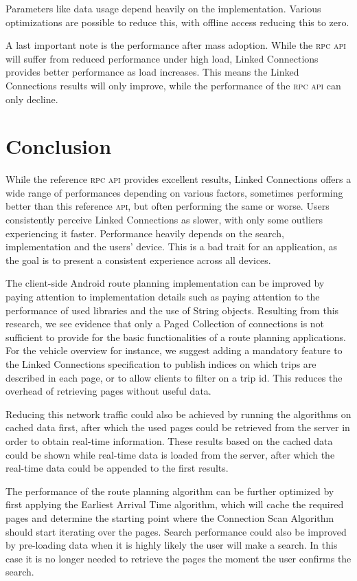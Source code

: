 \documentclass[twocolumn]{phdsymp} %
\begin{document}
Parameters like data usage depend heavily on the implementation. Various optimizations are possible to reduce this, with offline access reducing this to zero.

A last important note is the performance after mass adoption. While the \textsc{rpc} \textsc{api} will suffer from reduced performance under high load, Linked Connections provides better performance as load increases. This means the Linked Connections results will only improve, while the performance of the \textsc{rpc} \textsc{api} can only decline.

\section{Conclusion}
While the reference \textsc{rpc} \textsc{api} provides excellent results, Linked Connections offers a wide range of performances depending on various factors, sometimes performing better than this reference \textsc{api}, but often performing the same or worse. Users consistently perceive Linked Connections as slower, with only some outliers experiencing it faster. Performance heavily depends on the search, implementation and the users’ device. This is a bad trait for an application, as the goal is to present a consistent experience across all devices.

The client-side Android route planning implementation can be improved by paying attention to implementation details such as paying attention to the performance of used libraries and the use of String objects. Resulting from this research, we see evidence that only a Paged Collection of connections is not sufficient to provide for the basic functionalities of a route planning applications. For the vehicle overview for instance, we suggest adding a mandatory feature to the Linked Connections specification to publish indices on which trips are described in each page, or to allow clients to filter on a trip id. This reduces the overhead of retrieving pages without useful data.

Reducing this network traffic could also be achieved by running the algorithms on cached data first, after which the used pages could be retrieved from the server in order to obtain real-time information. These results based on the cached data could be shown while real-time data is loaded from the server, after which the real-time data could be appended to the first results.

The performance of the route planning algorithm can be further optimized by first applying the Earliest Arrival Time algorithm, which will cache the required pages and determine the starting point where the Connection Scan Algorithm should start iterating over the pages. Search performance could also be improved by pre-loading data when it is highly likely the user will make a search. In this case it is no longer needed to retrieve the pages the moment the user confirms the search.
\end{document}
